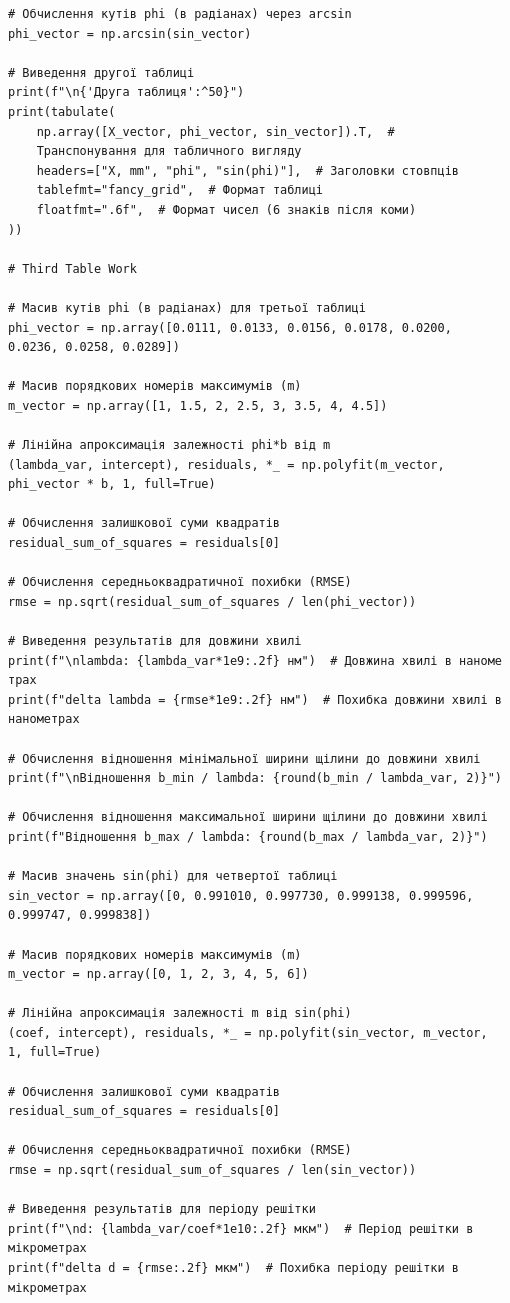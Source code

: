 \documentclass[12pt,a4paper]{article}
\begin{document}
{\begin{verbatim}
# Обчислення кутів phi (в радіанах) через arcsin
phi_vector = np.arcsin(sin_vector)

# Виведення другої таблиці
print(f"\n{'Друга таблиця':^50}")
print(tabulate(
    np.array([X_vector, phi_vector, sin_vector]).T,  #
    Транспонування для табличного вигляду
    headers=["X, mm", "phi", "sin(phi)"],  # Заголовки стовпців
    tablefmt="fancy_grid",  # Формат таблиці
    floatfmt=".6f",  # Формат чисел (6 знаків після коми)
))

# Third Table Work

# Масив кутів phi (в радіанах) для третьої таблиці
phi_vector = np.array([0.0111, 0.0133, 0.0156, 0.0178, 0.0200,
0.0236, 0.0258, 0.0289])

# Масив порядкових номерів максимумів (m)
m_vector = np.array([1, 1.5, 2, 2.5, 3, 3.5, 4, 4.5])

# Лінійна апроксимація залежності phi*b від m
(lambda_var, intercept), residuals, *_ = np.polyfit(m_vector,
phi_vector * b, 1, full=True)

# Обчислення залишкової суми квадратів
residual_sum_of_squares = residuals[0]

# Обчислення середньоквадратичної похибки (RMSE)
rmse = np.sqrt(residual_sum_of_squares / len(phi_vector))

# Виведення результатів для довжини хвилі
print(f"\nlambda: {lambda_var*1e9:.2f} нм")  # Довжина хвилі в наноме
трах
print(f"delta lambda = {rmse*1e9:.2f} нм")  # Похибка довжини хвилі в
нанометрах

# Обчислення відношення мінімальної ширини щілини до довжини хвилі
print(f"\nВідношення b_min / lambda: {round(b_min / lambda_var, 2)}")

# Обчислення відношення максимальної ширини щілини до довжини хвилі
print(f"Відношення b_max / lambda: {round(b_max / lambda_var, 2)}")

# Масив значень sin(phi) для четвертої таблиці
sin_vector = np.array([0, 0.991010, 0.997730, 0.999138, 0.999596,
0.999747, 0.999838])

# Масив порядкових номерів максимумів (m)
m_vector = np.array([0, 1, 2, 3, 4, 5, 6])

# Лінійна апроксимація залежності m від sin(phi)
(coef, intercept), residuals, *_ = np.polyfit(sin_vector, m_vector,
1, full=True)

# Обчислення залишкової суми квадратів
residual_sum_of_squares = residuals[0]

# Обчислення середньоквадратичної похибки (RMSE)
rmse = np.sqrt(residual_sum_of_squares / len(sin_vector))

# Виведення результатів для періоду решітки
print(f"\nd: {lambda_var/coef*1e10:.2f} мкм")  # Період решітки в
мікрометрах
print(f"delta d = {rmse:.2f} мкм")  # Похибка періоду решітки в
мікрометрах
\end{verbatim}
}
\end{document}
